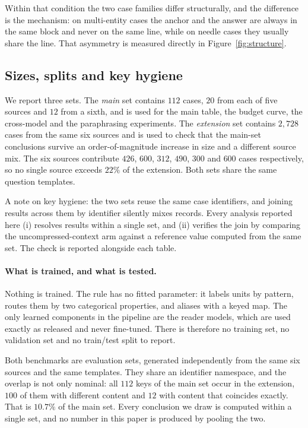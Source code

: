 Within that condition the two case families differ structurally, and the difference is the
mechanism: on multi-entity cases the anchor and the answer are always in the same block and
never on the same line, while on needle cases they usually share the line. That asymmetry is
measured directly in Figure~\ref{fig:structure}.

\subsection{Sizes, splits and key hygiene}

We report three sets. The \emph{main} set contains $112$ cases, $20$ from each of five
sources and $12$ from a sixth, and is used for the main table, the budget curve, the
cross-model and the paraphrasing experiments. The \emph{extension} set contains $2{,}728$
cases from the same six sources and is used to check that the main-set conclusions survive
an order-of-magnitude increase in size and a different source mix. The six sources contribute
$426$, $600$, $312$, $490$, $300$ and $600$ cases respectively, so no single source exceeds
$22\%$ of the extension. Both sets share the same question templates.

A note on key hygiene: the two sets reuse the same case identifiers, and joining results across
them by identifier silently mixes records. Every analysis reported here (i) resolves results
within a single set, and (ii) verifies the join by comparing the uncompressed-context arm against
a reference value computed from the same set. The check is reported alongside each table.

\paragraph{What is trained, and what is tested.}
Nothing is trained. The rule has no fitted parameter: it labels units by pattern, routes them by
two categorical properties, and aliases with a keyed map. The only learned components in the
pipeline are the reader models, which are used exactly as released and never fine-tuned. There is
therefore no training set, no validation set and no train/test split to report.

Both benchmarks are evaluation sets, generated independently from the same six sources and the
same templates. They share an identifier namespace, and the overlap is not only nominal: all $112$
keys of the main set occur in the extension, $100$ of them with different content and $12$ with
content that coincides exactly. That is $10.7\%$ of the main set. Every conclusion we draw is
computed within a single set, and no number in this paper is produced by pooling the two.

